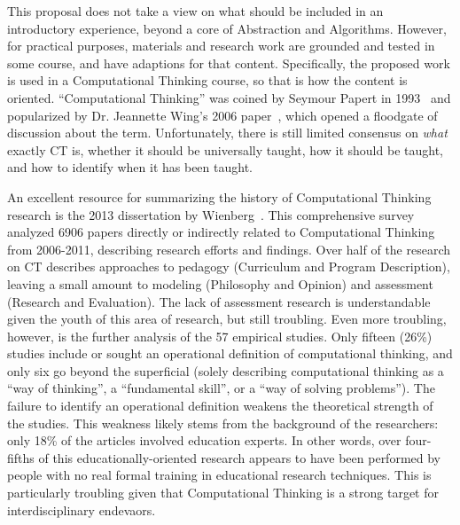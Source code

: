 This proposal does not take a view on what should be included in an introductory experience, beyond a core of Abstraction and Algorithms.
However, for practical purposes, materials and research work are grounded and tested in some course, and have adaptions for that content.
Specifically, the proposed work is used in a Computational Thinking course, so that is how the content is oriented.
``Computational Thinking'' was coined by Seymour Papert in 1993~\cite{papert1996} and popularized by Dr. Jeannette Wing's 2006 paper~\cite{wing2006}, which opened a floodgate of discussion about the term. 
Unfortunately, there is still limited consensus on \textit{what} exactly CT is, whether it should be universally taught, how it should be taught, and how to identify when it has been taught.

An excellent resource for summarizing the history of Computational Thinking research is the 2013 dissertation by Wienberg~\cite{weinberg2013}. 
This comprehensive survey analyzed 6906 papers directly or indirectly related to Computational Thinking from 2006-2011, describing research efforts and findings.     
Over half of the research on CT describes approaches to pedagogy (Curriculum and Program Description), leaving a small amount to modeling (Philosophy and Opinion) and assessment (Research and Evaluation). 
The lack of assessment research is understandable given the youth of this area of research, but still troubling.
Even more troubling, however, is the further analysis of the 57 empirical studies.
Only fifteen (26\%) studies include or sought an operational definition of computational thinking, and only six go beyond the superficial (solely describing computational thinking as a ``way of thinking'', a ``fundamental skill'', or a ``way of solving problems''). 
The failure to identify an operational definition weakens the theoretical strength of the studies.
This weakness likely stems from the background of the researchers: only 18\% of the articles involved education experts.
In other words, over four-fifths of this educationally-oriented research appears to have been performed by people with no real formal training in educational research techniques.
This is particularly troubling given that Computational Thinking is a strong target for interdisciplinary endevaors.

